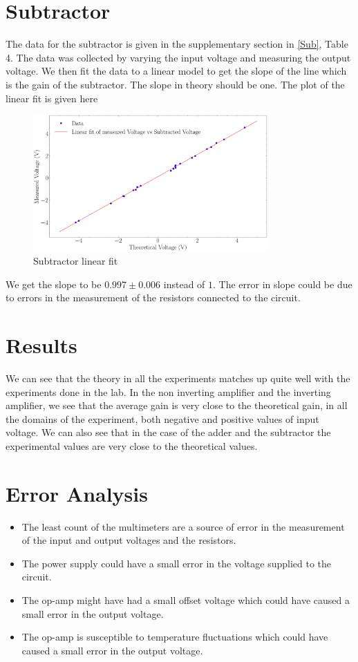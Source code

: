 \documentclass{scrartcl}
\newcommand{\1}{\mathbbm{1}}
\begin{document}
\section{Subtractor}
The data for the subtractor is given in the supplementary section in \cref{Sub}, Table 4. The data was collected by varying the input voltage and measuring the output voltage.
We then fit the data to a linear model to get the slope of the line which is the gain of the subtractor. The slope in theory should be one.
The plot of the linear fit is given here
\begin{figure}[H]
    \centering
    \includegraphics[width=0.8\textwidth]{Sub_plot.png}
    \caption{Subtractor linear fit}
\end{figure}
We get the slope to be $\mathbf{0.997 \pm 0.006} $ instead of $1$. The error in slope could be due to errors in the measurement of the resistors connected to the circuit.
\section{Results}
We can see that the theory in all the experiments matches up quite well with the experiments done in the lab. 
In the non inverting amplifier and the inverting amplifier, we see that the average gain is very close to the theoretical gain, in all the domains of the experiment,
both negative and positive values of input voltage. We can also see that in the case of the adder and the subtractor the experimental values are very close to the theoretical values.
\section{Error Analysis}
\begin{itemize}
    \item The least count of the multimeters are a source of error in the measurement of the input and output voltages and the resistors.
    \item The power supply could have a small error in the voltage supplied to the circuit.
    \item The op-amp might have had a small offset voltage which could have caused a small error in the output voltage.
    \item The op-amp is susceptible to temperature fluctuations which could have caused a small error in the output voltage.
\end{itemize}
\end{document}
